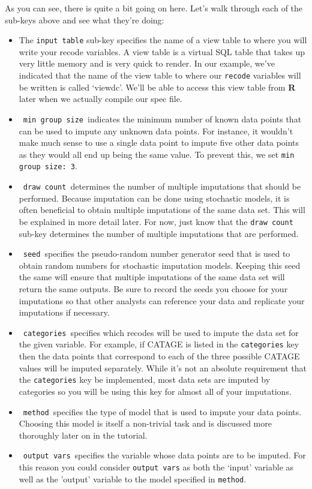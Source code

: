\documentclass{article}
\begin{document}
As you can see, there is quite a bit going on here. Let's walk through each of the sub-keys 
above and see what they're doing:
\begin{itemize}
\item The {\tt input table} sub-key specifies the name of a view table to 
where you will write your recode variables. A view table is a virtual SQL table 
that takes up very little memory and is very quick to render. In our example, we've indicated 
that the name of the view table to where our {\tt recode} variables will be written is 
called `viewdc'. We'll be able to access this view table from \textbf{R} later when we actually 
compile our spec file.\\
\item \ {\tt min group size}\ indicates the minimum number of known data points that can be 
used to impute any unknown data points. For instance, it wouldn't make much sense to use a single 
data point to impute five other data points as they would all end up being the same value. To 
prevent this, we set {\tt min group size: 3}.\\
\item \ {\tt draw count}\ determines the number of multiple imputations that should be performed. 
Because imputation can be done using stochastic models, it is often beneficial to obtain multiple 
imputations of the same data set. This will be explained in more detail later. For now, just know 
that the {\tt draw count} sub-key determines the number of multiple imputations that are performed.\\
\item \ {\tt seed}\ specifies the pseudo-random number generator seed that is used to obtain 
random numbers for stochastic imputation models. Keeping this seed the same will ensure that multiple imputations of the same data set will return the same outputs. Be sure to record the seeds you choose for your 
imputations so that other analysts can reference your data and replicate your imputations if necessary.\\
\item \ {\tt categories}\  specifies which recodes will be used to impute the data set for 
the given variable. For example, if CATAGE is listed in the {\tt categories} key then the 
data points that correspond to each of the three possible CATAGE values will be imputed 
separately. While it's not an absolute requirement that the {\tt categories} key be implemented, most data 
sets are imputed by categories so you will be using this key for almost all of your imputations.\\
\item \ {\tt method}\ specifies the type of model that is used to impute your data points. 
Choosing this model is itself a non-trivial task and is discussed more thoroughly later on 
in the tutorial.\\
\item \ {\tt output vars}\ specifies the variable whose data points are to be imputed. For this reason 
you could consider {\tt output vars} as both the `input' variable as well as the 'output' variable 
to the model specified in {\tt method}.\\
\end{itemize}
\end{document}
